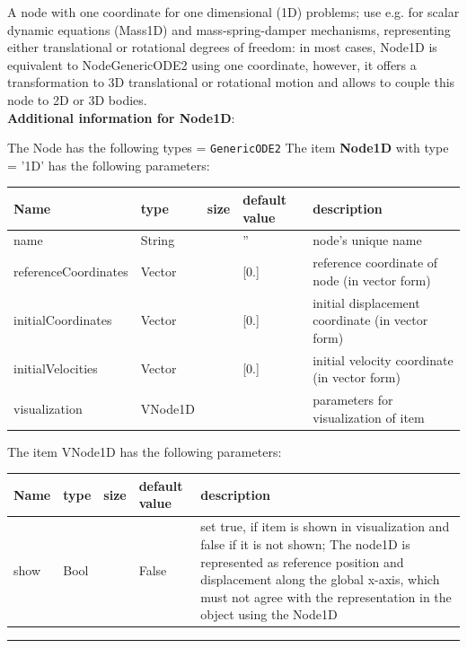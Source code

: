 \label{sec:item:Node1D}
A node with one  coordinate for one dimensional (1D) problems; use e.g. for scalar dynamic equations (Mass1D) and mass-spring-damper mechanisms, representing either translational or rotational degrees of freedom: in most cases, Node1D is equivalent to NodeGenericODE2 using one coordinate, however, it offers a transformation to 3D translational or rotational motion and allows to couple this node to 2D or 3D bodies.\vspace{12pt}
 \\{\bf Additional information for Node1D}:
\bi
  \item The Node has the following types = \texttt{GenericODE2}
\ei
\vspace{12pt} \noindent The item {\bf Node1D} with type = '1D' has the following parameters:\vspace{-1cm}\\ 
\begin{center}
  \footnotesize
  \begin{longtable}{| p{4.5cm} | p{2.5cm} | p{0.5cm} | p{2.5cm} | p{6cm} |}
    \hline
    \bf Name & \bf type & \bf size & \bf default value & \bf description \\ \hline
    name &     String &      &     '' &     node's unique name\\ \hline
    referenceCoordinates &     Vector &      &     [0.] &     reference coordinate of node (in vector form)\\ \hline
    initialCoordinates &     Vector &      &     [0.] &     initial displacement coordinate (in vector form)\\ \hline
    initialVelocities &     Vector &      &     [0.] &     initial velocity coordinate (in vector form)\\ \hline
    visualization & VNode1D & & & parameters for visualization of item \\ \hline
	  \end{longtable}
	\end{center}
The item VNode1D has the following parameters:\vspace{-1cm}\\ 
\begin{center}
  \footnotesize
  \begin{longtable}{| p{4.5cm} | p{2.5cm} | p{0.5cm} | p{2.5cm} | p{6cm} |}
    \hline
    \bf Name & \bf type & \bf size & \bf default value & \bf description \\ \hline
    show &     Bool &      &     False &     set true, if item is shown in visualization and false if it is not shown; The node1D is represented as reference position and displacement along the global x-axis, which must not agree with the representation in the object using the Node1D\\ \hline
	  \end{longtable}
	\end{center}
\par\noindent\rule{\textwidth}{0.4pt}
\label{description_Node1D}
